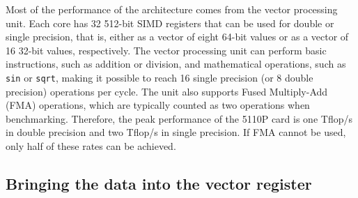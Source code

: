 \documentclass{sig-alternate}
\begin{document}
Most of the performance of the architecture comes from the vector
processing unit. Each core has 32 512-bit SIMD registers that can be
used for double or single precision, that is, either as a vector of eight
64-bit values or as a vector of 16 32-bit values, respectively. The
vector processing unit can perform basic instructions, such as
addition or division, and mathematical operations, such as {\tt sin} or
{\tt sqrt}, making it possible to reach 16 single precision (or 8 double precision)
operations per cycle.  
The unit also supports Fused Multiply-Add (FMA)
operations, which are typically counted as two operations 
when benchmarking. Therefore, the peak performance of the 5110P
card is one Tflop/s in double precision and two Tflop/s in single
precision. If FMA cannot be used, only half of these rates can be
achieved.


\subsection{Bringing the data into the vector register}
\end{document}

